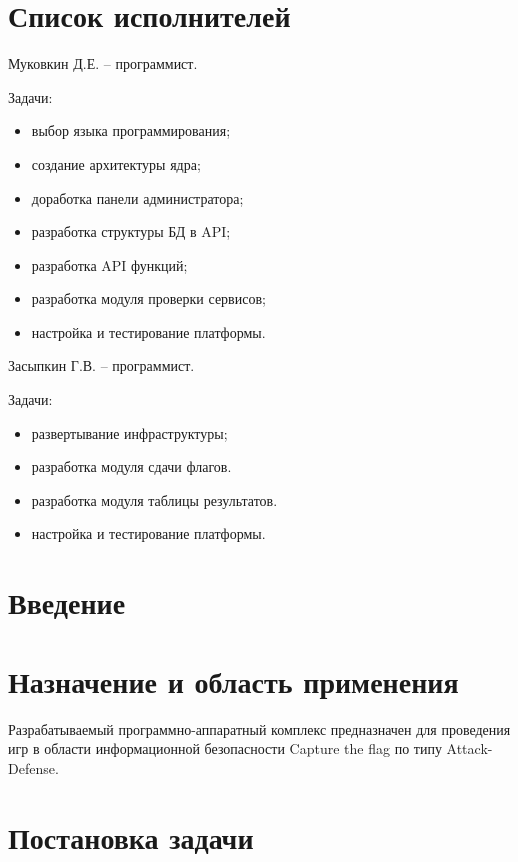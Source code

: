 


 
 
 
 \newpage
 \section*{Список исполнителей}

Муковкин Д.Е. -- программист.

Задачи:
\begin{itemize}
\item выбор языка программирования;
\item создание архитектуры ядра;
\item доработка панели администратора;
\item разработка структуры БД в API;
\item разработка API функций;
\item разработка модуля проверки сервисов;
\item настройка и тестирование платформы.
\end{itemize}

Засыпкин Г.В. -- программист.

Задачи:
\begin{itemize}
\item развертывание инфраструктуры;
\item разработка модуля сдачи флагов.
\item разработка модуля таблицы результатов.
\item настройка и тестирование платформы.
\end{itemize}
 
 \newpage
 \tableofcontents

 \newpage
 \section*{Введение}
 
 \newpage
 \section{Назначение и область применения}
Разрабатываемый программно-аппаратный комплекс предназначен для проведения игр в области информационной безопасности Capture the flag по типу Attack-Defense.
\section{Постановка задачи}
\setcounter{figure}{0}

